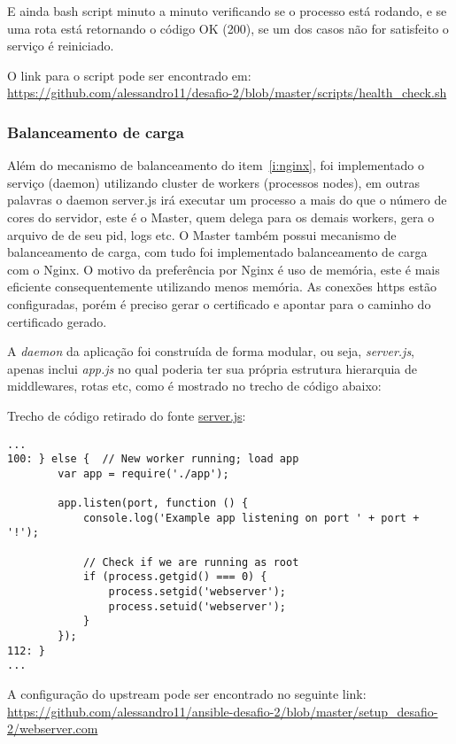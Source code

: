 E ainda bash script minuto a minuto verificando se o processo está rodando, e se
uma rota está retornando o código OK (200), se um dos casos não for
satisfeito o serviço é reiniciado.

O link para o script pode ser encontrado em:\\
\href{https://github.com/alessandro11/desafio-2/blob/master/scripts/health\_check.sh}{https://github.com/alessandro11/desafio-2/blob/master/scripts/health\_check.sh}


\subsubsection{Balanceamento de carga} \label{sec:balanceamento}
Além do mecanismo de balanceamento do item~\ref{i:nginx}, foi
implementado o serviço (daemon) utilizando cluster de workers
(processos nodes), em  outras palavras o daemon server.js
irá executar um processo a mais do que o número de cores do servidor,
este é o Master, quem delega para os demais workers, gera o arquivo de
de seu pid, logs etc. O Master também possui mecanismo de
balanceamento de carga, com tudo foi implementado balanceamento de
carga com o Nginx. O motivo da preferência por Nginx é uso de memória,
este é mais eficiente consequentemente utilizando menos memória. As
conexões https estão configuradas, porém é preciso 
gerar o certificado e apontar para o caminho do certificado
gerado.

A \emph{daemon} da aplicação foi construída de forma modular, ou seja,
\emph{server.js}, apenas inclui \emph{app.js} no qual poderia ter sua
própria estrutura hierarquia de middlewares, rotas etc, como é
mostrado no trecho de código abaixo:

Trecho de código retirado do fonte \href{https://github.com/alessandro11/desafio-2/blob/master/server.js}{server.js}:
\begin{verbatim}
...
100: } else {  // New worker running; load app
        var app = require('./app');

        app.listen(port, function () {
            console.log('Example app listening on port ' + port + '!');

            // Check if we are running as root
            if (process.getgid() === 0) {
                process.setgid('webserver');
                process.setuid('webserver');
            }
        });
112: }
...
\end{verbatim}

A configuração do upstream pode ser encontrado no seguinte link:\\
\href{https://github.com/alessandro11/ansible-desafio-2/blob/master/setup\_desafio-2/webserver.com}{https://github.com/alessandro11/ansible-desafio-2/blob/master/setup\_desafio-2/webserver.com}


